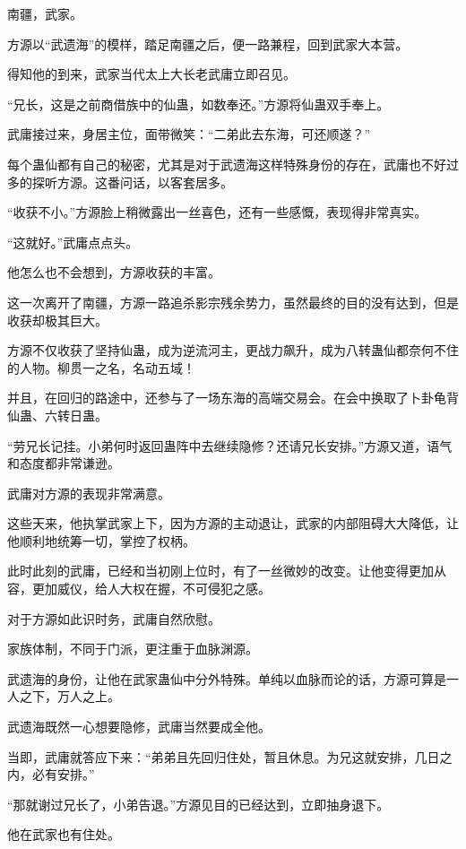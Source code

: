 
\begin{this_body}

南疆，武家。

方源以“武遗海”的模样，踏足南疆之后，便一路兼程，回到武家大本营。

得知他的到来，武家当代太上大长老武庸立即召见。

“兄长，这是之前商借族中的仙蛊，如数奉还。”方源将仙蛊双手奉上。

武庸接过来，身居主位，面带微笑：“二弟此去东海，可还顺遂？”

每个蛊仙都有自己的秘密，尤其是对于武遗海这样特殊身份的存在，武庸也不好过多的探听方源。这番问话，以客套居多。

“收获不小。”方源脸上稍微露出一丝喜色，还有一些感慨，表现得非常真实。

“这就好。”武庸点点头。

他怎么也不会想到，方源收获的丰富。

这一次离开了南疆，方源一路追杀影宗残余势力，虽然最终的目的没有达到，但是收获却极其巨大。

方源不仅收获了坚持仙蛊，成为逆流河主，更战力飙升，成为八转蛊仙都奈何不住的人物。柳贯一之名，名动五域！

并且，在回归的路途中，还参与了一场东海的高端交易会。在会中换取了卜卦龟背仙蛊、六转日蛊。

“劳兄长记挂。小弟何时返回蛊阵中去继续隐修？还请兄长安排。”方源又道，语气和态度都非常谦逊。

武庸对方源的表现非常满意。

这些天来，他执掌武家上下，因为方源的主动退让，武家的内部阻碍大大降低，让他顺利地统筹一切，掌控了权柄。

此时此刻的武庸，已经和当初刚上位时，有了一丝微妙的改变。让他变得更加从容，更加威仪，给人大权在握，不可侵犯之感。

对于方源如此识时务，武庸自然欣慰。

家族体制，不同于门派，更注重于血脉渊源。

武遗海的身份，让他在武家蛊仙中分外特殊。单纯以血脉而论的话，方源可算是一人之下，万人之上。

武遗海既然一心想要隐修，武庸当然要成全他。

当即，武庸就答应下来：“弟弟且先回归住处，暂且休息。为兄这就安排，几日之内，必有安排。”

“那就谢过兄长了，小弟告退。”方源见目的已经达到，立即抽身退下。

他在武家也有住处。


\end{this_body}
